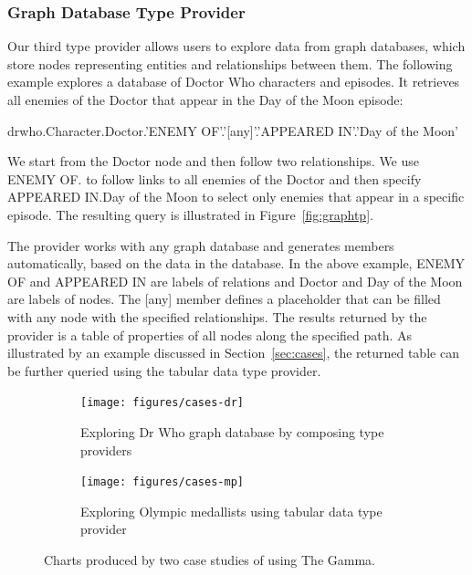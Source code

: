\documentclass[manuscript,review,anonymous]{acmart}
\newcommand{\ikvd}[1]{{\fontfamily{zi4}\selectfont\small #1}}
\begin{document}
\subsubsection*{Graph Database Type Provider}
Our third type provider allows users to explore data from graph databases, which store
nodes representing entities and relationships between them.
The following example explores a database of Doctor Who characters and episodes. It retrieves
all enemies of the Doctor that appear in the Day of the Moon episode:

\begin{thegamma}
drwho.Character.Doctor.'ENEMY OF'.'[any]'.'APPEARED IN'.'Day of the Moon'
\end{thegamma}

\noindent
We start from the \ikvd{Doctor} node and then follow two relationships. We use
\ikvd{\textquotesingle ENEMY OF\textquotesingle.\textquotesingle [any]\textquotesingle}
to follow links to all enemies of the Doctor and then specify
\ikvd{\textquotesingle APPEARED IN\textquotesingle.\textquotesingle Day of the Moon\textquotesingle}
to select only enemies that appear in a specific episode. The resulting query
is illustrated in Figure~\ref{fig:graphtp}.

The provider works with any graph database and generates members automatically, based on the
data in the database. In the above example, \ikvd{ENEMY OF} and \ikvd{APPEARED IN} are labels
of relations and \ikvd{Doctor} and \ikvd{Day of the Moon} are labels of nodes. The
\ikvd{[any]} member defines a placeholder that can be filled with any node with the specified
relationships. The results returned by the provider is a table of properties of all nodes
along the specified path. As illustrated by an example discussed in Section~\ref{sec:cases},
the returned table can be further queried using the tabular data type provider.

\begin{figure}[t]
\centering
\begin{subfigure}[b]{0.49\textwidth}
  \centering
  \texttt{[image: figures/cases-dr]}
  \caption{Exploring Dr Who graph database by composing type providers}
  \label{fig:cases-dr}
\end{subfigure}
\hfill
\begin{subfigure}[b]{0.49\textwidth}
  \centering
  \texttt{[image: figures/cases-mp]}
  \caption{Exploring Olympic medallists using tabular data type provider}
  \label{fig:cases-mp}
\end{subfigure}
\vspace{-0.5em}
\caption{Charts produced by two case studies of using The Gamma.}
\label{fig:cases}
\end{figure}
\end{document}
